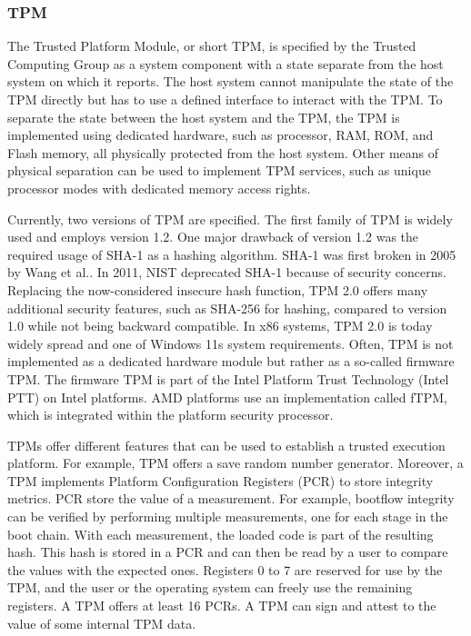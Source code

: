 \subsubsection{TPM}
\label{sec:20:tpm}
The Trusted Platform Module, or short TPM, is specified by the Trusted Computing Group as a system component with
a state separate from the host system on which it reports.\cite{tpm_architecture} The host system cannot
manipulate the state of the TPM directly but has to use a defined interface to interact with the TPM. To separate
the state between the host system and the TPM, the TPM is implemented using dedicated hardware, such as processor, RAM,
ROM, and Flash memory, all physically protected from the host system. Other means of physical separation can be used to
implement TPM services, such as unique processor modes with dedicated memory access rights.

Currently, two versions of TPM are specified. The first family of TPM is widely used and employs version 1.2. One major drawback
of version 1.2 was the required usage of SHA-1 as a hashing algorithm. SHA-1 was first broken in 2005 by Wang
et al.\cite{wang2005collision}. In 2011, NIST deprecated SHA-1 because of security concerns. Replacing the now-considered
insecure hash function, TPM 2.0 offers many additional security features, such as SHA-256 for hashing,
compared to version 1.0 while not being backward compatible. In x86 systems, TPM 2.0 is today widely spread and one of
Windows 11s system requirements. Often, TPM is not implemented as a dedicated hardware module but rather as a so-called
firmware TPM. The firmware TPM is part of the Intel Platform Trust Technology (Intel PTT) on Intel platforms. AMD
platforms use an implementation called fTPM, which is integrated within the platform security processor.\cite{pirker2024brief}

TPMs offer different features that can be used to establish a trusted execution platform. For example, TPM offers a save random number
generator. Moreover, a TPM implements Platform Configuration Registers (PCR) to store integrity metrics.
PCR store the value of a measurement. For example, bootflow integrity can be verified by performing multiple measurements,
one for each stage in the boot chain. With each measurement, the loaded code is part of the resulting hash. This hash is
stored in a PCR and can then be read by a user to compare the values with the expected ones. Registers 0 to 7 are
reserved for use by the TPM, and the user or the operating system can freely use the remaining registers. A TPM offers
at least 16 PCRs.
A TPM can sign and attest to the value of some internal TPM data.

